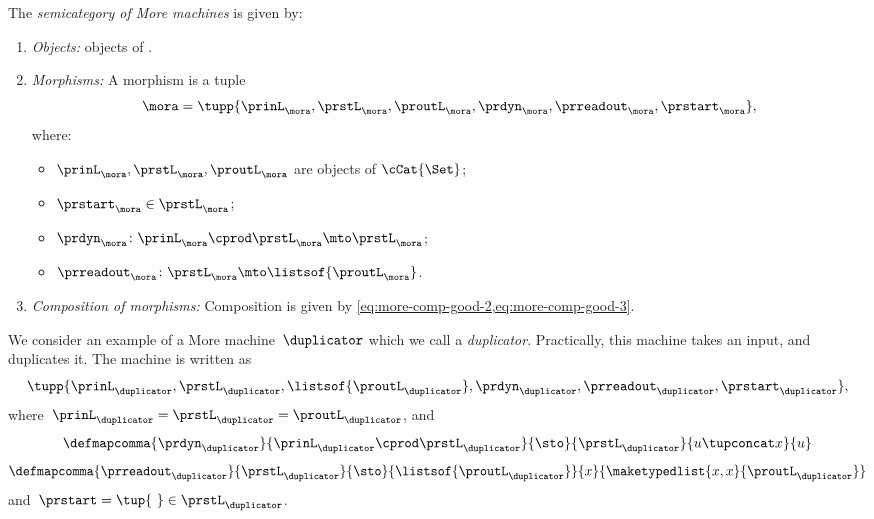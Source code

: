 \begin{definition}[\More]
    \label{def:More}
    The \emph{semicategory of More machines} \More is given by:
    \begin{enumerate}
        \item \emph{Objects:} objects of \cCat{\Set}.
        \item \emph{Morphisms:}
              A morphism is a tuple
              \begin{equation}
                  \mora = \tupp{\prinL_{\mora},\prstL_{\mora}, \proutL_{\mora},\prdyn_{\mora},\prreadout_{\mora},\prstart_{\mora}},
              \end{equation}
              where:
              \begin{itemize}
                  \item $\prinL_{\mora},\prstL_{\mora}, \proutL_{\mora}$ are objects of $\cCat{\Set}$;
                  \item $\prstart_{\mora} \in \prstL_{\mora}$;
                  \item $ \prdyn_{\mora} \colon \prinL_{\mora} \cprod \prstL_{\mora} \mto \prstL_{\mora}$;
                  \item $ \prreadout_{\mora} \colon \prstL_{\mora}  \mto \listsof{\proutL_{\mora}}$.
              \end{itemize}
        \item \emph{Composition of morphisms:}
              Composition is given by \cref{eq:more-comp-good-2,eq:more-comp-good-3}.
    \end{enumerate}
\end{definition}


\begin{example}[Duplicator]
    We consider an example of a More machine~$\duplicator$ which we call a \emph{duplicator}.
    Practically, this machine takes an input, and duplicates it.
    The machine is written as
    \begin{equation*}
        \tupp{\prinL_{\duplicator},\prstL_{\duplicator},\listsof{\proutL_{\duplicator}},\prdyn_{\duplicator},\prreadout_{\duplicator},\prstart_{\duplicator}},
    \end{equation*}
    where~$\prinL_{\duplicator}=\prstL_{\duplicator}=\proutL_\duplicator$, and
    \begin{equation*}
        \defmapcomma{\prdyn_\duplicator}
        { \prinL_\duplicator \cprod \prstL_\duplicator}
        {\sto}
        {\prstL_\duplicator}
        {u \tupconcat x}
        {u}
    \end{equation*}
    \begin{equation*}
        \defmapcomma{\prreadout_\duplicator}
        {\prstL_\duplicator}
        {\sto}
        {\listsof{\proutL_\duplicator}}
        {x}
       {\maketypedlist{x,x}{\proutL_\duplicator}}
    \end{equation*}
    and~$\prstart=\tup{ \ } \in \prstL_\duplicator$.
\end{example}

